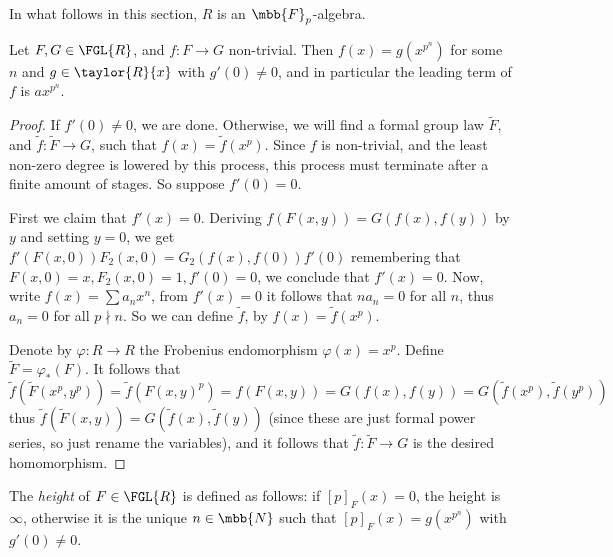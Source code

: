 In what follows in this section, $R$ is an $\mbb{F}_p$-algebra.

\begin{lemma*}
	Let $F,G \in \FGL{R}$, and $f: F \to G$ non-trivial.
	Then $f\left(x\right) = g\left(x^{p^n}\right)$ for some $n$ and $g\in \taylor{R}{x}$ with $g'\left(0\right) \neq 0$, and in particular the leading term of $f$ is $ax^{p^n}$.
\end{lemma*}

\begin{proof}
	If $f'\left(0\right) \neq 0$, we are done.
	Otherwise, we will find a formal group law $\tilde{F}$, and $\tilde{f}: \tilde{F} \to G$, such that $f\left(x\right) = \tilde{f}\left(x^p\right)$. Since $f$ is non-trivial, and the least non-zero degree is lowered by this process, this process must terminate after a finite amount of stages.
	So suppose $f'\left(0\right) = 0$.
	
	First we claim that $f'\left(x\right) = 0$.
	Deriving $f\left(F\left(x,y\right)\right) = G\left(f\left(x\right),f\left(y\right)\right)$ by $y$ and setting $y=0$, we get
	$
		f'\left(F\left(x,0\right)\right) F_2\left(x,0\right)
		= G_2\left(f\left(x\right),f\left(0\right)\right) f'\left(0\right)
	$
	remembering that $F\left(x,0\right) = x, F_2\left(x,0\right) = 1, f'\left(0\right) = 0$,
	we conclude that $f'\left(x\right) = 0$.
	Now, write $f\left(x\right) = \sum a_n x^n$,
	from $f'\left(x\right) = 0$ it follows that $na_n = 0$ for all $n$, thus $a_n = 0$ for all $p \nmid n$.
	So we can define $\tilde{f}$, by $f\left(x\right) = \tilde{f}\left(x^p\right)$.
	
	Denote by $\varphi: R \to R$ the Frobenius endomorphism $\varphi\left(x\right) = x^p$.
	Define $\tilde{F} = \varphi_*\left(F\right)$.
	It follows that
	$$
		\tilde{f}\left(\tilde{F}\left(x^p, y^p\right)\right)
		= \tilde{f}\left(F\left(x, y\right)^p\right)
		= f\left(F\left(x, y\right)\right)
		= G\left(f\left(x\right),f\left(y\right)\right)
		= G\left(\tilde{f}\left(x^p\right),\tilde{f}\left(y^p\right)\right)
	$$
	thus
	$
		\tilde{f}\left(\tilde{F}\left(x, y\right)\right)
		= G\left(\tilde{f}\left(x\right),\tilde{f}\left(y\right)\right)
	$
	(since these are just formal power series, so just rename the variables),
	and it follows that $\tilde{f}: \tilde{F} \to G$ is the desired homomorphism.
\end{proof}

\begin{definition*}
	The \emph{height} of $F \in \FGL{R}$ is defined as follows:
	if $\left[p\right]_F\left(x\right) = 0$, the height is $\infty$,
	otherwise it is the unique $n \in \mbb{N}$ such that $\left[p\right]_F\left(x\right) = g\left(x^{p^n}\right)$ with $g'\left(0\right) \neq 0$.
\end{definition*}

